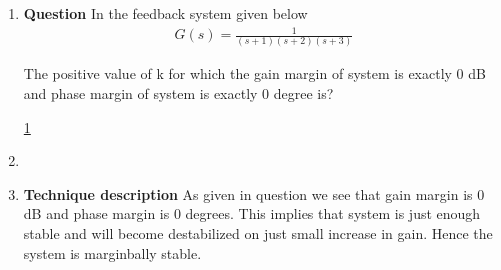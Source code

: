 \begin{enumerate}[label=\thesection.\arabic*.,ref=\thesection.\theenumi]

\item
\textbf{Question}
In the feedback system given below 
\begin{align}
G(s) = \frac{1}{(s+1)(s+2)(s+3)}
\end{align}

The positive value of k for which the gain margin of system is exactly 0 dB and phase margin of system is exactly 0 degree is?
\begin{figure}[!ht]
	\begin{center}
		
		\resizebox{\columnwidth}{!}{}
	\end{center}
\caption{}
\label{fig:ee18btech11036}
\end{figure}

\ref{fig:ee18btech11036}


\item












\item
\textbf{Technique description}
As given in question we see that gain margin is 0 dB and phase margin is 0 degrees. This implies that system is just enough stable and will become destabilized on just small increase in gain. Hence the system is marginbally stable.



\end{enumerate}
